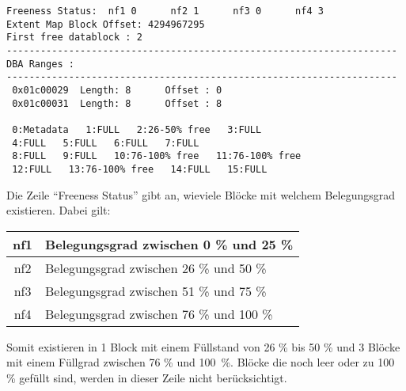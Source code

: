           \begin{lstlisting}[caption={Der Inhalt eines Level 1 Bitmap-Blocks},label=admin101,emph={[9]FULL},emphstyle={[9]\color{black}},language=terminal]
Freeness Status:  nf1 0      nf2 1      nf3 0      nf4 3
Extent Map Block Offset: 4294967295
First free datablock : 2
---------------------------------------------------------------------
DBA Ranges :
---------------------------------------------------------------------
 0x01c00029  Length: 8      Offset : 0
 0x01c00031  Length: 8      Offset : 8

 0:Metadata   1:FULL   2:26-50% free   3:FULL
 4:FULL   5:FULL   6:FULL   7:FULL
 8:FULL   9:FULL   10:76-100% free   11:76-100% free
 12:FULL   13:76-100% free   14:FULL   15:FULL

          \end{lstlisting}
          Die Zeile \enquote{Freeness Status} gibt an, wieviele Blöcke mit welchem Belegungsgrad existieren. Dabei gilt:
          \begin{center}
            \tabletail{
              \hline
            }
            \begin{supertabular}[h]{|c|l|}
              nf1 & Belegungsgrad zwischen 0 \% und 25 \% \\
              \hline
              nf2 & Belegungsgrad zwischen 26 \% und 50 \%  \\
              \hline
              nf3 & Belegungsgrad zwischen 51 \% und 75 \%  \\
              \hline
              nf4 & Belegungsgrad zwischen 76 \% und 100 \% \\
            \end{supertabular}
          \end{center}
          Somit existieren in  1 Block mit einem Füllstand von 26 \% bis 50 \% und 3 Blöcke mit einem Füllgrad zwischen 76 \% und 100~\%. Blöcke die noch leer oder zu 100 \% gefüllt sind, werden in dieser Zeile nicht berücksichtigt.

